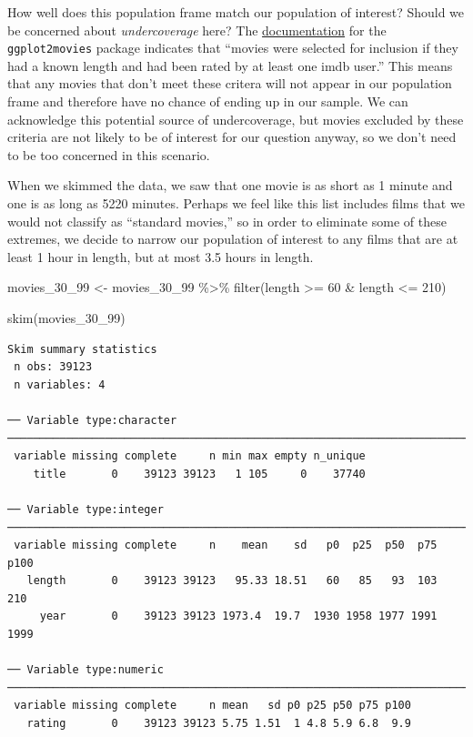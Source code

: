 \documentclass[
  letterpaper,
  DIV=11,
  numbers=noendperiod]{scrreprt}
\newenvironment{Shaded}{\begin{snugshade}}{\end{snugshade}}
\newcommand{\DecValTok}[1]{\textcolor[rgb]{0.68,0.00,0.00}{#1}}
\newcommand{\FunctionTok}[1]{\textcolor[rgb]{0.28,0.35,0.67}{#1}}
\newcommand{\NormalTok}[1]{\textcolor[rgb]{0.00,0.23,0.31}{#1}}
\newcommand{\OtherTok}[1]{\textcolor[rgb]{0.00,0.23,0.31}{#1}}
\newcommand{\SpecialCharTok}[1]{\textcolor[rgb]{0.37,0.37,0.37}{#1}}
\theoremstyle{definition}
\theoremstyle{remark}
\begin{document}
How well does this population frame match our population of interest?
Should we be concerned about \emph{undercoverage} here? The
\href{https://cran.r-project.org/web/packages/ggplot2movies/ggplot2movies.pdf}{documentation}
for the \texttt{ggplot2movies} package indicates that ``movies were
selected for inclusion if they had a known length and had been rated by
at least one imdb user.'' This means that any movies that don't meet
these critera will not appear in our population frame and therefore have
no chance of ending up in our sample. We can acknowledge this potential
source of undercoverage, but movies excluded by these criteria are not
likely to be of interest for our question anyway, so we don't need to be
too concerned in this scenario.

When we skimmed the data, we saw that one movie is as short as 1 minute
and one is as long as 5220 minutes. Perhaps we feel like this list
includes films that we would not classify as ``standard movies,'' so in
order to eliminate some of these extremes, we decide to narrow our
population of interest to any films that are at least 1 hour in length,
but at most 3.5 hours in length.

\begin{Shaded}
\begin{Highlighting}[]
\NormalTok{movies\_30\_99 }\OtherTok{\textless{}{-}}\NormalTok{ movies\_30\_99 }\SpecialCharTok{\%\textgreater{}\%} 
  \FunctionTok{filter}\NormalTok{(length }\SpecialCharTok{\textgreater{}=} \DecValTok{60} \SpecialCharTok{\&}\NormalTok{ length }\SpecialCharTok{\textless{}=} \DecValTok{210}\NormalTok{)}

\FunctionTok{skim}\NormalTok{(movies\_30\_99)}
\end{Highlighting}
\end{Shaded}

\begin{verbatim}
Skim summary statistics
 n obs: 39123 
 n variables: 4 

── Variable type:character ────────────────────────────────────────────────────────────────────────────
 variable missing complete     n min max empty n_unique
    title       0    39123 39123   1 105     0    37740

── Variable type:integer ──────────────────────────────────────────────────────────────────────────────
 variable missing complete     n    mean    sd   p0  p25  p50  p75 p100
   length       0    39123 39123   95.33 18.51   60   85   93  103  210
     year       0    39123 39123 1973.4  19.7  1930 1958 1977 1991 1999

── Variable type:numeric ──────────────────────────────────────────────────────────────────────────────
 variable missing complete     n mean   sd p0 p25 p50 p75 p100
   rating       0    39123 39123 5.75 1.51  1 4.8 5.9 6.8  9.9
\end{verbatim}
\end{document}

